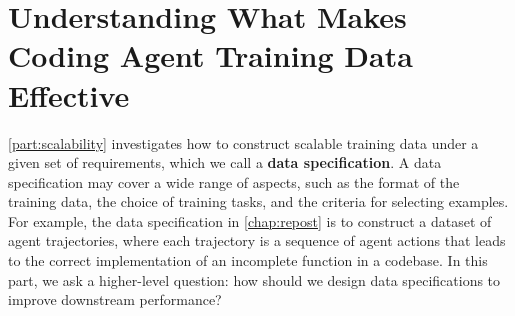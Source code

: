 

\part{Understanding What Makes Coding Agent Training Data Effective}
\label{part:generalizability}

\autoref{part:scalability} investigates how to construct scalable training data under a given set of requirements, which we call a \textbf{data specification}. A data specification may cover a wide range of aspects, such as the format of the training data, the choice of training tasks, and the criteria for selecting examples. For example, the data specification in \autoref{chap:repost} is to construct a dataset of agent trajectories, where each trajectory is a sequence of agent actions that leads to the correct implementation of an incomplete function in a codebase. 
In this part, we ask a higher-level question: how should we design data specifications to improve downstream performance?





